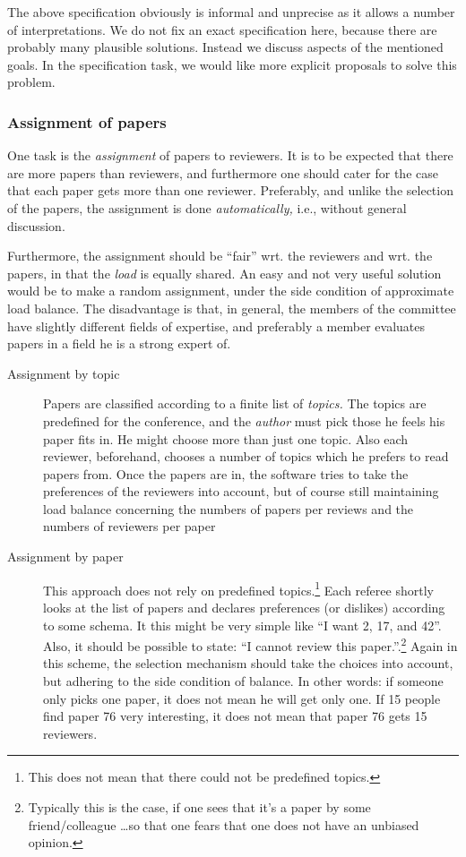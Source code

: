 The above specification obviously is informal and unprecise as it allows a
number of interpretations. We do not fix an exact specification here,
because there are probably many plausible solutions.  Instead we discuss
aspects of the mentioned goals. In the specification task, we would like
more explicit proposals to solve this problem.

\subsubsection{Assignment of papers}

One task is the \emph{assignment} of papers to reviewers. It is to be
expected that there are more papers than reviewers, and furthermore one
should cater for the case that each paper gets more than one reviewer.
Preferably, and unlike the selection of the papers, the assignment is done
\emph{automatically,} i.e., without general discussion.

Furthermore, the assignment should be ``fair'' wrt. the reviewers and wrt.
the papers, in that the \emph{load} is equally shared. An easy and not very
useful solution would be to make a random assignment, under the side
condition of approximate load balance. The disadvantage is that, in
general, the members of the committee have slightly different fields of
expertise, and preferably a member evaluates papers in a field he is a
strong expert of. %

\begin{description}
\item[Assignment by topic] Papers are classified according to a finite list
  of \emph{topics.} The topics are predefined for the conference, and the
  \emph{author} must pick those he feels his paper fits in. He might choose
  more than just one topic. Also each reviewer, beforehand, chooses a
  number of topics which he prefers to read papers from. Once the papers
  are in, the software tries to take the preferences of the reviewers into
  account, but of course still maintaining load balance concerning the
  numbers of papers per reviews and the numbers of reviewers per paper
\item[Assignment by paper] This approach does not rely on predefined
  topics.\footnote{This does not mean that there could not be predefined
    topics.} Each referee shortly looks at the list of papers and declares
  preferences (or dislikes) according to some schema. It this might be very
  simple like ``I want 2, 17, and 42''. Also, it should be possible to
  state: ``I cannot review this paper.''.\footnote{Typically this is the
    case, if one sees that it's a paper by some friend/colleague \ldots so
    that one fears that one does not have an unbiased opinion.} Again in
  this scheme, the selection mechanism should take the choices into
  account, but adhering to the side condition of balance. In other words:
  if someone only picks one paper, it does not mean he will get only one.
  If 15 people find paper 76 very interesting, it does not mean that paper
  76 gets 15 reviewers.
\end{description}


